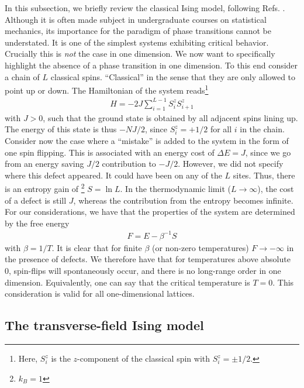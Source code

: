In this subsection, we briefly review the classical Ising model, following Refs.
\cite{isingBeitragZurTheorie1925,blundellMagnetismCondensedMatter2011}. Although it is
often made subject in undergraduate courses on statistical mechanics, its
importance for the paradigm of phase transitions cannot be understated. It is
one of the simplest systems exhibiting critical behavior. Crucially this is
\emph{not} the case in one
dimension. We now want to specifically highlight the absence of a phase transition
in one dimension. To this end consider a chain of $L$ classical spins.
\enquote{Classical} in the sense that they are only allowed to point up or
down. The Hamiltonian of the system reads\footnote{Here, $S^z_i$ is the
$z$-component of the classical spin with $S^z_i = \pm 1 /2$.}
\begin{align}
  H = -2J\sum_{i=1}^{L-1} S^z_i S^z_{i+1}
\end{align}
with $J>0$, such that the ground state is obtained by all adjacent spins lining
up. The energy of this state is thus $-NJ /2$, since $S^z_i = +1 /2$ for all
$i$ in the chain. Consider now the case where a \enquote{mistake} is added to
the system in the form of one spin flipping. This is associated with an energy
cost of $\Delta E=J$, since we go from an energy saving $J /2$ contribution to
$-J /2$. However, we did not specify where this defect appeared. It could have
been on any of the $L$ sites. Thus, there is an entropy gain of
\footnote{$k_B=1$} $S = \ln L$. In the thermodynamic limit ($L\to \infty$), the
cost of a defect is still $J$, whereas the contribution from the entropy
becomes infinite. For our considerations, we have that the properties of the
system are determined by the free energy 
\begin{align}
  F = E - \beta^{-1} S
\end{align}
with $\beta = 1 / T$. It is clear that for finite $\beta$ (or non-zero
temperatures) $F \to -\infty$ in the presence of defects. We therefore have
that for temperatures above absolute 0, spin-flips will spontaneously occur,
and there is no long-range order in one dimension. Equivalently, one can say
that the critical temperature is $T=0$. This consideration is valid for all
one-dimensional lattices.

\subsection{The transverse-field Ising model}

